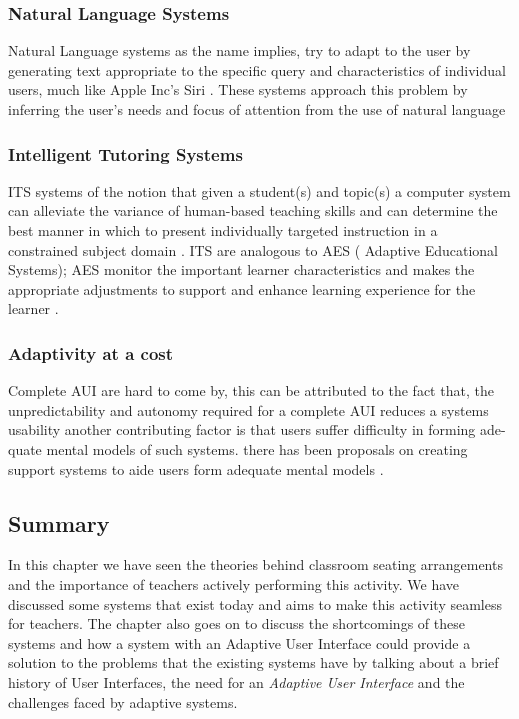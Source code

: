 \subsubsection{Natural Language Systems}
Natural Language systems as the name implies, try to adapt to the user by generating text appropriate to the specific query and characteristics of individual users, much like Apple Inc's Siri \cite{website:SIRI}. These systems approach this problem by inferring the user's needs and focus of attention from the use of natural language \cite{benyon1993adaptive}
\subsubsection{Intelligent Tutoring Systems}
ITS systems of the notion that given a student(s) and topic(s) a computer system can alleviate the variance of human-based teaching skills and can determine the best manner in which to present individually targeted instruction in a constrained subject domain \cite{benyon1993adaptive}. ITS are analogous to AES ( Adaptive Educational Systems); AES monitor the important learner characteristics and makes the appropriate adjustments to support and enhance learning experience for the learner \cite{shute2012adaptive}.
\subsubsection{Adaptivity at a cost}
Complete AUI are hard to come by, this can be attributed to the fact that, the unpredictability and autonomy required for a complete AUI reduces a systems usability another contributing factor is that users suffer difficulty in forming ade- quate mental models of such systems. there has been proposals on creating support systems to aide users form adequate mental models \cite{paymans2004usability}.
\subsection{Summary}
In this chapter we have seen the theories behind classroom seating arrangements and the importance of teachers actively performing this activity. We have discussed some systems that exist today and aims to make this activity seamless for teachers. The chapter also goes on to discuss the shortcomings of these systems and how a system with an Adaptive User Interface could provide a solution to the problems that the existing systems have by talking about a brief history of User Interfaces, the need for an \emph{Adaptive User Interface} and the challenges faced by adaptive systems.
